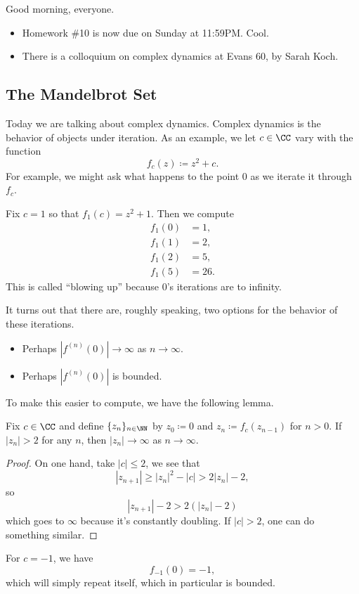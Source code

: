 \documentclass[../notes.tex]{subfiles}
\begin{document}

Good morning, everyone.
\begin{itemize}
	\item Homework \#10 is now due on Sunday at 11:59PM. Cool.
	\item There is a colloquium on complex dynamics at Evans 60, by Sarah Koch.
\end{itemize}

\subsection{The Mandelbrot Set}
Today we are talking about complex dynamics. Complex dynamics is the behavior of objects under iteration. As an example, we let $c\in\CC$ vary with the function
\[f_c(z)\coloneqq z^2+c.\]
For example, we might ask what happens to the point $0$ as we iterate it through $f_c$.
\begin{example}
	Fix $c=1$ so that $f_1(c)=z^2+1$. Then we compute
	\begin{align*}
		f_1(0) &= 1, \\
		f_1(1) &= 2, \\
		f_1(2) &= 5, \\
		f_1(5) &= 26.
	\end{align*}
	This is called ``blowing up'' because $0$'s iterations are to infinity.
\end{example}
It turns out that there are, roughly speaking, two options for the behavior of these iterations.
\begin{itemize}
	\item Perhaps $\left|f^{(n)}(0)\right|\to\infty$ as $n\to\infty$.
	\item Perhaps $\left|f^{(n)}(0)\right|$ is bounded.
\end{itemize}
To make this easier to compute, we have the following lemma.
\begin{lemma}
	Fix $c\in\CC$ and define $\{z_n\}_{n\in\NN}$ by $z_0\coloneqq0$ and $z_n\coloneqq f_c(z_{n-1})$ for $n>0$. If $|z_n|>2$ for any $n$, then $|z_n|\to\infty$ as $n\to\infty$.
\end{lemma}
\begin{proof}
	On one hand, take $|c|\le2$, we see that
	\[|z_{n+1}|\ge|z_n|^2-|c|>2|z_n|-2,\]
	so
	\[|z_{n+1}|-2>2(|z_n|-2)\]
	which goes to $\infty$ because it's constantly doubling. If $|c|>2$, one can do something similar.
\end{proof}
\begin{example}
	For $c=-1$, we have
	\[f_{-1}(0)=-1,\]
	which will simply repeat itself, which in particular is bounded.
\end{example}
\end{document}
